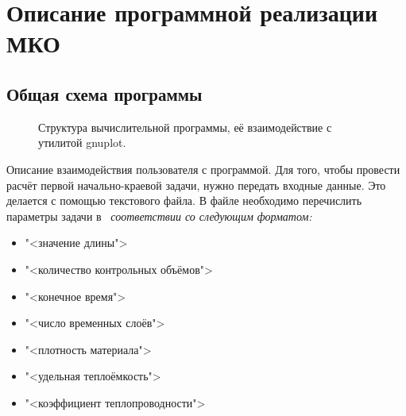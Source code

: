 \documentclass[oneside, final, 14pt]{report}
\begin{document}
\chapter{Описание программной реализации МКО}
\section{Общая схема программы}
\begin{figure}[hb!]
 \caption{Структура вычислительной программы, её взаимодействие с утилитой gnuplot.}
 \label{prog_scheme}
\end{figure}
\newpage
Описание взаимодействия пользователя с программой. Для того, чтобы провести расчёт первой начально-краевой задачи, нужно передать входные данные. Это делается с помощью текстового файла. В файле необходимо перечислить параметры задачи в ~\emph{соответствии со следующим форматом:}
\begin{itemize}
 \item "<значение длины">
 \item "<количество контрольных объёмов">
 \item "<конечное время">
 \item "<число временных слоёв">
 \item "<плотность материала">
 \item "<удельная теплоёмкость">
 \item "<коэффициент теплопроводности">
\end{itemize}
\end{document}
